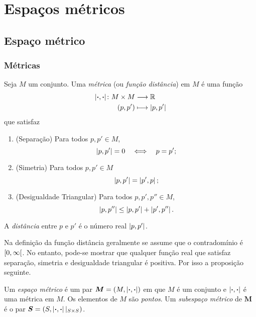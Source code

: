 \chapter{Espaços métricos}

\section{Espaço métrico}

\subsection{Métricas}

\begin{definition}
Seja $M$ um conjunto. Uma \emph{métrica} (ou \emph{função distância}) em $M$ é uma função
	\begin{align*}
	{\left\vert{\bm{\cdot}},{\bm{\cdot}}\right\vert}\colon {M \times M} &\longrightarrow {\mathbb{R}} \\{(p,p')} &\longmapsto \left\vert{p},{p'}\right\vert
	\end{align*}
que satisfaz
	\begin{enumerate}
	\item (Separação) Para todos $p,p' \in M$,
		\begin{equation*}
		\left\vert{p},{p'}\right\vert = 0 \quad \Longleftrightarrow \quad p = p';
		\end{equation*}
	\item (Simetria) Para todos $p,p' \in M$
		\begin{equation*}
		\left\vert{p},{p'}\right\vert = \left\vert{p'},{p}\right\vert;
		\end{equation*}
	\item (Desigualdade Triangular) Para todos $p,p',p'' \in M$,
		\begin{equation*}
		\left\vert{p},{p''}\right\vert \leq \left\vert{p},{p'}\right\vert + \left\vert{p'},{p''}\right\vert.
		\end{equation*}
	\end{enumerate}
A \emph{distância} entre $p$ e $p'$ é o número real $\left\vert{p},{p'}\right\vert$.
\end{definition}

Na definição da função distância geralmente se assume que o contradomínio é $\left[{0},{\infty}\right[$. No entanto, pode-se mostrar que qualquer função real que satisfaz separação, simetria e desigualdade triangular é positiva. Por isso a proposição seguinte.

\begin{definition}
Um \emph{espaço métrico} é um par $\bm M = (M,\left\vert{\bm{\cdot}},{\bm{\cdot}}\right\vert)$ em que $M$ é um conjunto e $\left\vert{\bm{\cdot}},{\bm{\cdot}}\right\vert$ é uma métrica em $M$. Os elementos de $M$ são \emph{pontos}. Um \emph{subespaço métrico} de $\bm M$ é o par $\bm S=(S,\left\vert{\bm{\cdot}},{\bm{\cdot}}\right\vert|_{S \times S})$.
\end{definition}

